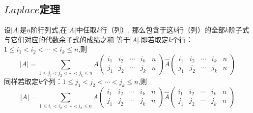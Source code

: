 \subsection{\texorpdfstring{$Laplace$}{\textit{Laplace}}定理}
\begin{theorem}[$Laplace$定理]
  设$|A|$是$n$阶行列式,在$|A|$中任取$k$行（列）,
  那么包含于这$k$行（列）的全部$k$阶子式与它们对应的代数余子式的成绩之和
  等于$|A|$.即若取定$k$个行：$1 \leq i_1 < i_2 < \cdots < i_k \leq n$,则
  \begin{equation}
    \label{eq:1-6}
    |A|=\sum\limits_{1 \leq j_1 < j_2 < \cdots < j_k \leq n}
    A\begin{pmatrix}i_1 & i_2 & \cdots & i_k & n\\
        j_1 & j_2 & \cdots & j_k & n\end{pmatrix}
    \widehat{A}\begin{pmatrix}i_1 & i_2 & \cdots & i_k & n\\
        j_1 & j_2 & \cdots & j_k & n\end{pmatrix}
  \end{equation}
  同样若取定$k$个列：$1 \leq j_1 < j_2 < \cdots < j_k \leq n$,则
  \begin{equation}
    \label{eq:1-7}
    |A|=\sum\limits_{1 \leq i_1 < i_2 < \cdots < i_k \leq n}
    A\begin{pmatrix}i_1 & i_2 & \cdots & i_k & n\\
        j_1 & j_2 & \cdots & j_k & n\end{pmatrix}
    \widehat{A}\begin{pmatrix}i_1 & i_2 & \cdots & i_k & n\\
        j_1 & j_2 & \cdots & j_k & n\end{pmatrix}
  \end{equation}
\end{theorem}

